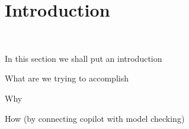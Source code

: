 \section{Introduction}~\label{sec:intro}

In this section we shall put an introduction 

What are we trying to accomplish

Why

How  (by connecting copilot with model checking) 



